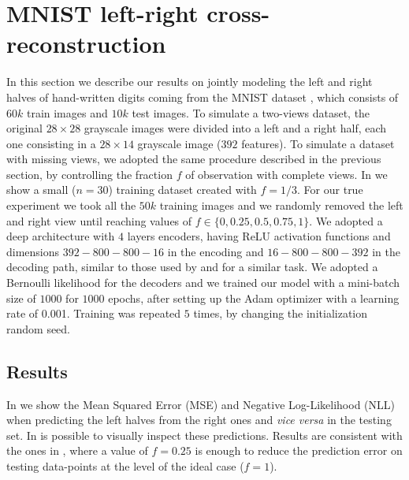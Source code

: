 \section{MNIST left-right cross-reconstruction}
\label{sec:mnist}


In this section we describe our results on jointly modeling the left and right halves of hand-written digits coming from the MNIST dataset \citep{mnist}, which consists of $60k$ train images and $10k$ test images.
To simulate a two-views dataset, the original $28 \times 28$ grayscale images were divided into a left and a right half, each one consisting in a $28 \times 14$ grayscale image ($392$ features).
To simulate a dataset with missing views, we adopted the same procedure described in the previous section, by controlling the fraction $f$ of observation with complete views.
In  we show a small ($n=30$) training dataset created with $f=1/3$.
For our true experiment we took all the $50k$ training images and we randomly removed the left and right view until reaching values of $f \in \{0, 0.25, 0.5, 0.75, 1\}$.
We adopted a deep architecture with $4$ layers encoders, having ReLU activation functions and dimensions $392-800-800-16$ in the encoding and $16-800-800-392$ in the decoding path,
similar to those used by \cite{dcca1} and \cite{dcca2} for a similar task.
We adopted a Bernoulli likelihood for the decoders and we trained our model with a mini-batch size of $1000$ for $1000$ epochs, after setting up the Adam optimizer with a learning rate of 0.001.
Training was repeated $5$ times, by changing the initialization random seed.

\subsection{Results}
In  we show the Mean Squared Error (MSE) and Negative Log-Likelihood (NLL) when predicting the left halves from the right ones and \textit{vice versa} in the testing set.
In  is possible to visually inspect these predictions.
Results are consistent with the ones in , where a value of $f = 0.25$ is enough to reduce the prediction error on testing data-points at the level of the ideal case ($f=1$).


